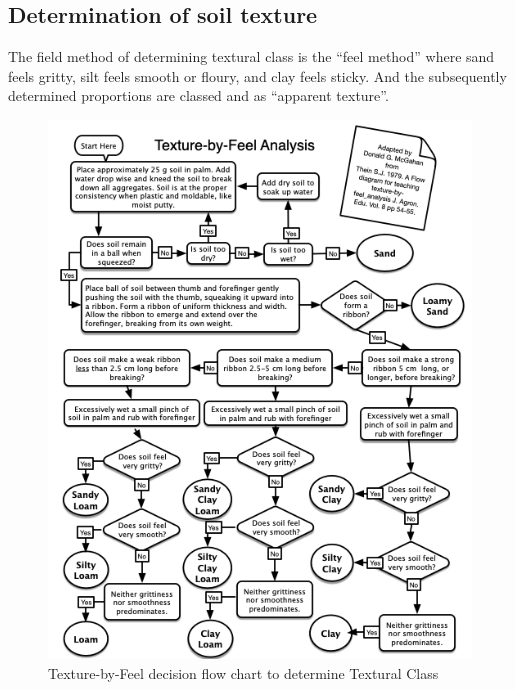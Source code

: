 \documentclass[letterpaper, 12pt]{article}
\begin{document}
    
\subsection{Determination of soil texture}

The field method of determining textural class is the \enquote{feel method} where sand feels gritty, silt feels smooth or floury, and clay feels sticky. And the subsequently determined proportions are classed and as \enquote{apparent texture}.

\begin{figure}
    \includegraphics[width=0.9\columnwidth]{images/TextureFlowChart.png}
    \caption{Texture-by-Feel decision flow chart to determine Textural Class}
    \label{fig:TextureByFeelFlowChart}
\end{figure}
\end{document}
